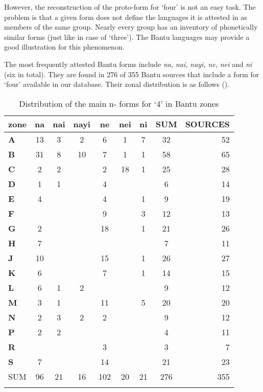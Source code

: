 However, the reconstruction of the proto-form for ‘four’ is not an easy task. The problem is that a given form does not define the languages it is attested in as members of the same group. Nearly every group has an inventory of phonetically similar forms (just like in case of ‘three’). The Bantu languages may provide a good illustration for this phenomenon. 

The most frequently attested Bantu forms include \textit{na,} \textit{nai,} \textit{nayi,} \textit{ne,} \textit{nei} and \textit{ni} (six in total). They are found in 276 of 355 Bantu sources that include a form for ‘four’ available in our database. Their zonal distribution is as follows ().

\begin{table}
\caption{\label{tab:4:14}Distribution of the main n- forms for `4' in Bantu zones}


\begin{tabularx}{\textwidth}{lSSSSSSSr}
\lsptoprule
zone & \textbf{na} & \textbf{nai} & \textbf{nayi} & \textbf{ne} & \textbf{nei} & \textbf{ni} & SUM&SOURCES\\
\midrule
\textbf{A} & 13 & 3 & 2 & 6 & 1 & 7 & 32 & 52\\
\textbf{B} & 31 & 8 & 10 & 7 & 1 & 1 & 58 & 65\\
\textbf{C} & 2 & 2 & ~ & 2 & 18 & 1 & 25 & 28\\
\textbf{D} & 1 & 1 & ~ & 4 & ~ & ~ & 6 & 14\\
\textbf{E} & 4 & ~ & ~ & 4 & ~ & 1 & 9 & 19\\
\textbf{F} & ~ & ~ & ~ & 9 & ~ & 3 & 12 & 13\\
\textbf{G} & 2 & ~ & ~ & 18 & ~ & 1 & 21 & 26\\
\textbf{H} & 7 & ~ & ~ & ~ & ~ & ~ & 7 & 11\\
\textbf{J} & 10 & ~ & ~ & 15 & ~ & 1 & 26 & 27\\
\textbf{K} & 6 & ~ & ~ & 7 & ~ & 1 & 14 & 15\\
\textbf{L} & 6 & 1 & 2 & ~ & ~ & ~ & 9 & 12\\
\textbf{M} & 3 & 1 & ~ & 11 & ~ & 5 & 20 & 20\\
\textbf{N} & 2 & 3 & 2 & 2 & ~ & ~ & 9 & 12\\
\textbf{P} & 2 & 2 & ~ & ~ & ~ & ~ & 4 & 11\\
\textbf{R} & ~ & ~ & ~ & 3 & ~ & ~ & 3 & 7\\
\textbf{S} & 7 & ~ & ~ & 14 & ~ & ~ & 21 & 23\\
\midrule 
SUM & 96 & 21 & 16 & 102 & 20 & 21 & 276 & 355\\

\lspbottomrule
\end{tabularx}
\end{table}

